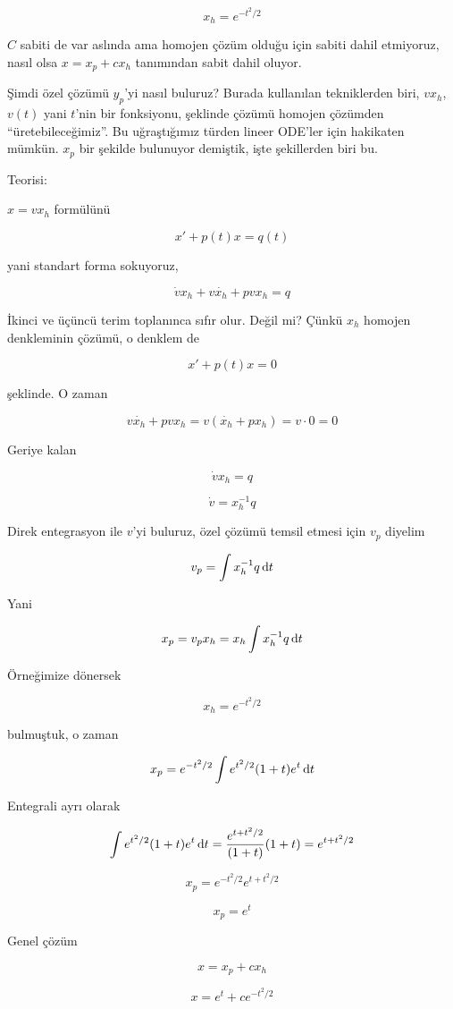 \documentclass[12pt,fleqn]{article}\usepackage{../../common}
\begin{document}
$$ x_h = e^{-t^2/2} $$

$C$ sabiti de var aslında ama homojen çözüm olduğu için sabiti dahil
etmiyoruz, nasıl olsa $x = x_p + cx_h$ tanımından sabit dahil oluyor.

Şimdi özel çözümü $y_p$'yi nasıl buluruz? Burada kullanılan tekniklerden
biri, $vx_h$, $v(t)$ yani $t$'nin bir fonksiyonu, şeklinde çözümü homojen
çözümden ``üretebileceğimiz''. Bu uğraştığımız türden lineer ODE'ler için
hakikaten mümkün. $x_p$ bir şekilde bulunuyor demiştik, işte şekillerden
biri bu.

Teorisi:

$x=vx_h$ formülünü 

$$ x' + p(t)x = q(t) $$
 
yani standart forma sokuyoruz, 

$$ \dot{v}x_h + v\dot{x_h} + pvx_h = q $$

İkinci ve üçüncü terim toplanınca sıfır olur. Değil mi? Çünkü $x_h$ homojen
denkleminin çözümü, o denklem de

$$ x' + p(t)x = 0 $$
 
şeklinde. O zaman

$$ v\dot{x_h} + pvx_h = v(\dot{x_h} + px_h) = v \cdot 0 = 0 $$

Geriye kalan 

$$ \dot{v}x_h  = q $$

$$ \dot{v} = x_h^{-1} q $$

Direk entegrasyon ile $v$'yi buluruz, özel çözümü temsil etmesi için $v_p$
diyelim

$$ v_p = \int x_h^{-1} q \,\mathrm{d} t$$

Yani 

$$ x_p = v_p x_h = x_h \int x_h^{-1} q \,\mathrm{d} t $$

Örneğimize dönersek

$$ x_h = e^{-t^2/2} $$
 
bulmuştuk, o zaman 

$$ x_p =  e^{-t^2/2} \int e^{t^2/2} (1+t)e^t \,\mathrm{d} t$$

Entegrali ayrı olarak

$$
\int e^{t^2/2} (1+t)e^t \,\mathrm{d} t  = 
\frac{e^{t+ t^2/2}}{(1+t)}{(1+t)} = 
e^{t+ t^2/2}
$$

$$ x_p =  e^{-t^2/2} e^{t+ t^2/2} $$

$$ x_p = e^t $$

Genel çözüm 

$$ x = x_p + cx_h $$

$$ x = e^t + ce^{-t^2/2}  $$
\end{document}
